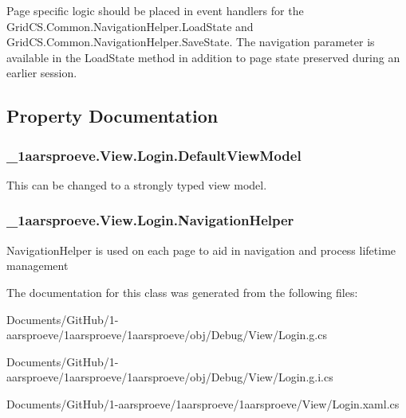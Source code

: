 Page specific logic should be placed in event handlers for the Grid\+C\+S.\+Common.\+Navigation\+Helper.\+Load\+State and Grid\+C\+S.\+Common.\+Navigation\+Helper.\+Save\+State. The navigation parameter is available in the Load\+State method in addition to page state preserved during an earlier session. 

\subsection{Property Documentation}
\hypertarget{class__1aarsproeve_1_1_view_1_1_login_a7955bd79c353b1dcdcfcd7b73874b0a6}{}
\subsubsection[{Default\+View\+Model}]{ \+\_\+1aarsproeve.\+View.\+Login.\+Default\+View\+Model\hspace{0.3cm}{\ttfamily [get]}}\label{class__1aarsproeve_1_1_view_1_1_login_a7955bd79c353b1dcdcfcd7b73874b0a6}


This can be changed to a strongly typed view model. 

\hypertarget{class__1aarsproeve_1_1_view_1_1_login_a6ce27e4b6c4ba6f4785c2d98d4685477}{}
\subsubsection[{Navigation\+Helper}]{ \+\_\+1aarsproeve.\+View.\+Login.\+Navigation\+Helper\hspace{0.3cm}{\ttfamily [get]}}\label{class__1aarsproeve_1_1_view_1_1_login_a6ce27e4b6c4ba6f4785c2d98d4685477}


Navigation\+Helper is used on each page to aid in navigation and process lifetime management 



The documentation for this class was generated from the following files\+:\begin{DoxyCompactItemize}
\item 
Documents/\+Git\+Hub/1-\/aarsproeve/1aarsproeve/1aarsproeve/obj/\+Debug/\+View/Login.\+g.\+cs\item 
Documents/\+Git\+Hub/1-\/aarsproeve/1aarsproeve/1aarsproeve/obj/\+Debug/\+View/Login.\+g.\+i.\+cs\item 
Documents/\+Git\+Hub/1-\/aarsproeve/1aarsproeve/1aarsproeve/\+View/Login.\+xaml.\+cs\end{DoxyCompactItemize}
